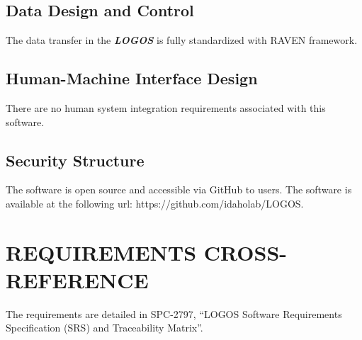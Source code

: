 \subsection{Data Design and Control}
The data transfer in the \textbf{\textit{LOGOS}} is fully standardized with RAVEN framework.

\subsection{Human-Machine Interface Design}
There are no human system integration requirements associated with this software.

\subsection{Security Structure}
The software is open source and accessible via GitHub to users.
The software is available at the following url: https://github.com/idaholab/LOGOS.

\section{REQUIREMENTS CROSS-REFERENCE}
The requirements are detailed in SPC-2797, ``LOGOS Software Requirements Specification (SRS) and Traceability Matrix''.
